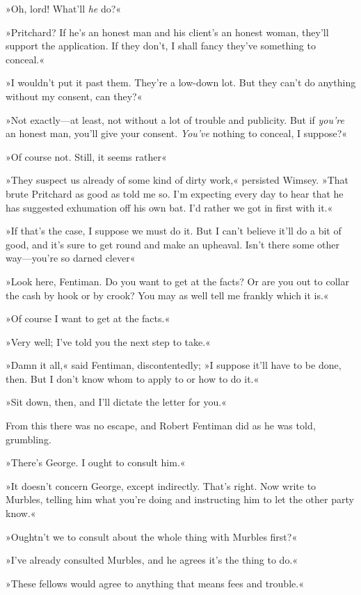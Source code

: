 »Oh, lord! What'll \textit{he} do?«

»Pritchard? If he's an honest man and his client's an honest woman, they'll support the application. If they don't, I shall fancy they've something to conceal.«

»I wouldn't put it past them. They're a low-down lot. But they can't do anything without my consent, can they?«

»Not exactly—at least, not without a lot of trouble and publicity. But if \textit{you're} an honest man, you'll give your consent. \textit{You've} nothing to conceal, I suppose?«

»Of course not. Still, it seems rather\longdash«

»They suspect us already of some kind of dirty work,« persisted Wimsey. »That brute Pritchard as good as told me so. I'm expecting every day to hear that he has suggested exhumation off his own bat. I'd rather we got in first with it.«

»If that's the case, I suppose we must do it. But I can't believe it'll do a bit of good, and it's sure to get round and make an upheaval. Isn't there some other way—you're so darned clever\longdash«

»Look here, Fentiman. Do you want to get at the facts? Or are you out to collar the cash by hook or by crook? You may as well tell me frankly which it is.«

»Of course I want to get at the facts.«

»Very well; I've told you the next step to take.«

»Damn it all,« said Fentiman, discontentedly; »I suppose it'll have to be done, then. But I don't know whom to apply to or how to do it.«

»Sit down, then, and I'll dictate the letter for you.«

From this there was no escape, and Robert Fentiman did as he was told, grumbling.

»There's George. I ought to consult him.«

»It doesn't concern George, except indirectly. That's right. Now write to Murbles, telling him what you're doing and instructing him to let the other party know.«

»Oughtn't we to consult about the whole thing with Murbles first?«

»I've already consulted Murbles, and he agrees it's the thing to do.«

»These fellows would agree to anything that means fees and trouble.«

